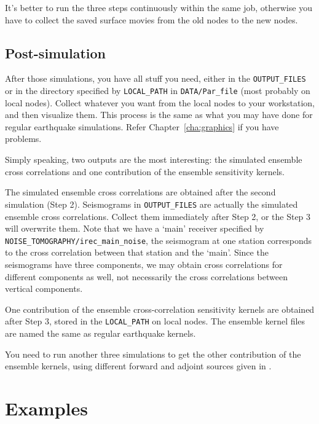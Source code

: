 It's better to run the three steps continuously within the same job, otherwise you have to collect the saved surface movies
from the old nodes to the new nodes.\newline

\subsection{Post-simulation}

After those simulations, you have all stuff you need, either in the \texttt{OUTPUT\_FILES} or
in the directory specified by \texttt{LOCAL\_PATH} in \texttt{DATA/Par\_file} (most probably on local nodes).
Collect whatever you want from the local nodes to your workstation, and then visualize them.
This process is the same as what you may have done for regular earthquake simulations.
Refer Chapter~\ref{cha:graphics} if you have problems.\newline


Simply speaking, two outputs are the most interesting: the simulated ensemble cross correlations and
one contribution of the ensemble sensitivity kernels.\newline


The simulated ensemble cross correlations are obtained after the second simulation (Step 2).
Seismograms in \texttt{OUTPUT\_FILES} are actually the simulated ensemble cross correlations.
Collect them immediately after Step 2, or the Step 3 will overwrite them.
Note that we have a `main' receiver specified by \texttt{NOISE\_TOMOGRAPHY/irec\_main\_noise},
the seismogram at one station corresponds to the cross correlation between that station and the `main'.
Since the seismograms have three components, we may obtain cross correlations
for different components as well, not necessarily the cross correlations between vertical components.\newline


One contribution of the ensemble cross-correlation sensitivity kernels are obtained after Step 3,
stored in the \texttt{LOCAL\_PATH} on local nodes.
The ensemble kernel files are named the same as regular earthquake kernels.\newline


You need to run another three simulations to get the other contribution of the ensemble kernels,
using different forward and adjoint sources given in \citet{trompetal2010}.

\section{Examples}

